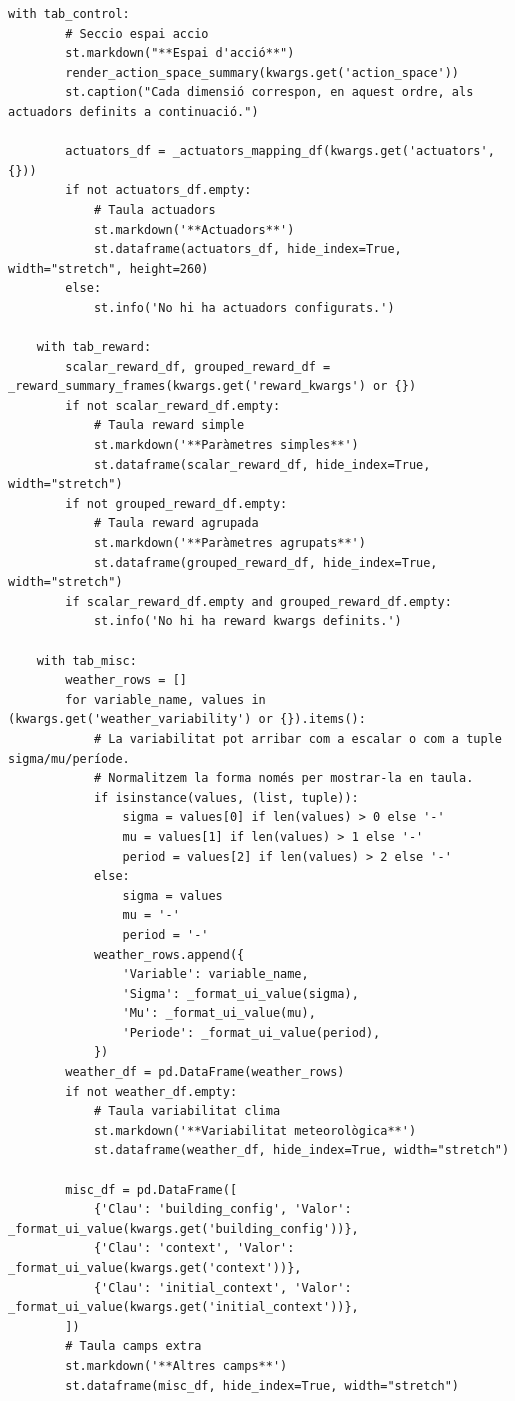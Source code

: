 \documentclass[10pt,a4paper]{article}
\begin{document}
\begin{lstlisting}[style=studioPython,caption={pages/Mostrar\_Entorn.py},label={lst:pages-mostrar-entorn-py}]
    with tab_control:
        # Seccio espai accio
        st.markdown("**Espai d'acció**")
        render_action_space_summary(kwargs.get('action_space'))
        st.caption("Cada dimensió correspon, en aquest ordre, als actuadors definits a continuació.")

        actuators_df = _actuators_mapping_df(kwargs.get('actuators', {}))
        if not actuators_df.empty:
            # Taula actuadors
            st.markdown('**Actuadors**')
            st.dataframe(actuators_df, hide_index=True, width="stretch", height=260)
        else:
            st.info('No hi ha actuadors configurats.')

    with tab_reward:
        scalar_reward_df, grouped_reward_df = _reward_summary_frames(kwargs.get('reward_kwargs') or {})
        if not scalar_reward_df.empty:
            # Taula reward simple
            st.markdown('**Paràmetres simples**')
            st.dataframe(scalar_reward_df, hide_index=True, width="stretch")
        if not grouped_reward_df.empty:
            # Taula reward agrupada
            st.markdown('**Paràmetres agrupats**')
            st.dataframe(grouped_reward_df, hide_index=True, width="stretch")
        if scalar_reward_df.empty and grouped_reward_df.empty:
            st.info('No hi ha reward kwargs definits.')

    with tab_misc:
        weather_rows = []
        for variable_name, values in (kwargs.get('weather_variability') or {}).items():
            # La variabilitat pot arribar com a escalar o com a tuple sigma/mu/període.
            # Normalitzem la forma només per mostrar-la en taula.
            if isinstance(values, (list, tuple)):
                sigma = values[0] if len(values) > 0 else '-'
                mu = values[1] if len(values) > 1 else '-'
                period = values[2] if len(values) > 2 else '-'
            else:
                sigma = values
                mu = '-'
                period = '-'
            weather_rows.append({
                'Variable': variable_name,
                'Sigma': _format_ui_value(sigma),
                'Mu': _format_ui_value(mu),
                'Periode': _format_ui_value(period),
            })
        weather_df = pd.DataFrame(weather_rows)
        if not weather_df.empty:
            # Taula variabilitat clima
            st.markdown('**Variabilitat meteorològica**')
            st.dataframe(weather_df, hide_index=True, width="stretch")

        misc_df = pd.DataFrame([
            {'Clau': 'building_config', 'Valor': _format_ui_value(kwargs.get('building_config'))},
            {'Clau': 'context', 'Valor': _format_ui_value(kwargs.get('context'))},
            {'Clau': 'initial_context', 'Valor': _format_ui_value(kwargs.get('initial_context'))},
        ])
        # Taula camps extra
        st.markdown('**Altres camps**')
        st.dataframe(misc_df, hide_index=True, width="stretch")


\end{lstlisting}
\end{document}
